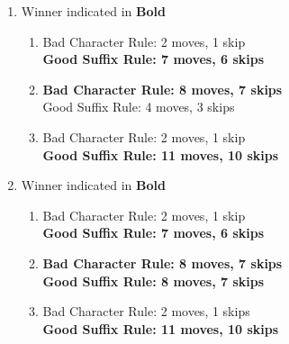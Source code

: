 \documentclass[12pt]{article}
\begin{document}
\begin{enumerate}
\begin{enumerate}[label=(\alph*)]
        
    \end{enumerate}
    \item Winner indicated in \textbf{Bold}
    \begin{enumerate}[label=(\alph*)]
        \item 
        Bad Character Rule: 2 moves, 1 skip
         \\ \textbf{Good Suffix Rule: 7 moves, 6 skips}
        \item
        \textbf{Bad Character Rule: 8 moves, 7 skips}
        \\ Good Suffix Rule: 4 moves, 3 skips
        \item
        Bad Character Rule: 2 moves, 1 skip 
        \\ \textbf{Good Suffix Rule: 11 moves, 10 skips}
    \end{enumerate}
    \item Winner indicated in \textbf{Bold}
    \begin{enumerate}[label=(\alph*)]
        \item 
        Bad Character Rule: 2 moves, 1 skip
         \\ \textbf{Good Suffix Rule: 7 moves, 6 skips}
        \item
        \textbf{Bad Character Rule: 8 moves, 7 skips}
        \\ \textbf{Good Suffix Rule: 8 moves, 7 skips}
        \item
        Bad Character Rule: 2 moves, 1 skips 
        \\ \textbf{Good Suffix Rule: 11 moves, 10 skips}
    \end{enumerate}
\end{enumerate}



\end{document}
